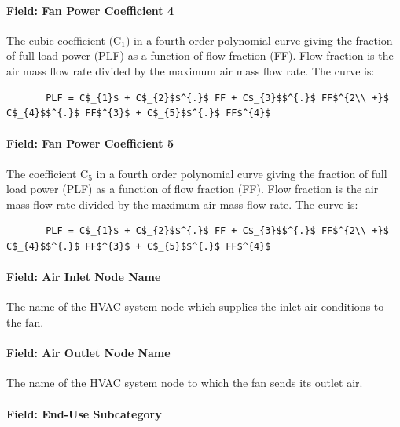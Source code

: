 \paragraph{Field: Fan Power Coefficient 4}\label{field-fan-power-coefficient-4}

The cubic coefficient (C\(_{1}\)) in a fourth order polynomial curve giving the fraction of full load power (PLF) as a function of flow fraction (FF). Flow fraction is the air mass flow rate divided by the maximum air mass flow rate. The curve is:

\begin{lstlisting}
       PLF = C$_{1}$ + C$_{2}$$^{.}$ FF + C$_{3}$$^{.}$ FF$^{2\\ +}$ C$_{4}$$^{.}$ FF$^{3}$ + C$_{5}$$^{.}$ FF$^{4}$
\end{lstlisting}

\paragraph{Field: Fan Power Coefficient 5}\label{field-fan-power-coefficient-5}

The coefficient C\(_{5}\) in a fourth order polynomial curve giving the fraction of full load power (PLF) as a function of flow fraction (FF). Flow fraction is the air mass flow rate divided by the maximum air mass flow rate. The curve is:

\begin{lstlisting}
       PLF = C$_{1}$ + C$_{2}$$^{.}$ FF + C$_{3}$$^{.}$ FF$^{2\\ +}$ C$_{4}$$^{.}$ FF$^{3}$ + C$_{5}$$^{.}$ FF$^{4}$
\end{lstlisting}

\paragraph{Field: Air Inlet Node Name}\label{field-air-inlet-node-name-2-000}

The name of the HVAC system node which supplies the inlet air conditions to the fan.

\paragraph{Field: Air Outlet Node Name}\label{field-air-outlet-node-name-2-000}

The name of the HVAC system node to which the fan sends its outlet air.

\paragraph{Field: End-Use Subcategory}

